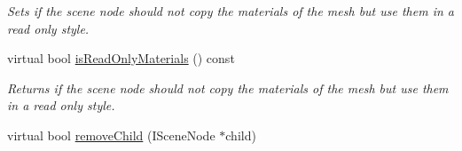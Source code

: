 \begin{DoxyCompactItemize}
\begin{DoxyCompactList}\small\item\em Sets if the scene node should not copy the materials of the mesh but use them in a read only style. \end{DoxyCompactList}\item 
\hypertarget{classirr_1_1scene_1_1_c_cube_scene_node_a47ad08ae4394b3abdabd7482c6500e48}{virtual bool \hyperlink{classirr_1_1scene_1_1_c_cube_scene_node_a47ad08ae4394b3abdabd7482c6500e48}{is\-Read\-Only\-Materials} () const }\label{classirr_1_1scene_1_1_c_cube_scene_node_a47ad08ae4394b3abdabd7482c6500e48}

\begin{DoxyCompactList}\small\item\em Returns if the scene node should not copy the materials of the mesh but use them in a read only style. \end{DoxyCompactList}\item 
virtual bool \hyperlink{classirr_1_1scene_1_1_c_cube_scene_node_ac0af94d6c23fdc04963251ef549e0bb2}{remove\-Child} (I\-Scene\-Node $\ast$child)
\end{DoxyCompactItemize}


